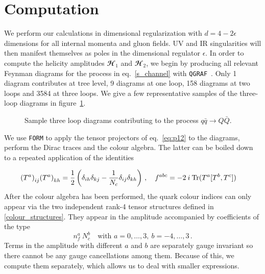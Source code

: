 
\section{Computation}
\label{computation}

We perform our calculations in dimensional regularization with $d = 4 - 2 \epsilon$ dimensions for all internal momenta and gluon fields. UV and IR singularities will then manifest themselves as poles in the dimensional regulator $\epsilon$.
In order to compute the  helicity amplitudes $\mathbfcal{H}_1$ and $\mathbfcal{H}_2$,  we begin by producing all relevant Feynman diagrams for the process in eq.~\eqref{s_channel} with \texttt{QGRAF}~\cite{Nogueira:1991ex}. Only 1 diagram contributes at tree level,  9 diagrams at one loop, 158 diagrams at two loops and 3584 at three loops. We give a few representative samples of the three-loop diagrams in figure~\ref{diagrams}. 
\begingroup
\centering
\begin{figure}[htbp]
\centering
{}\label{fig:1a}
\label{fig:1b}
\label{fig:1c}



\label{fig:1d}
\label{fig:1e}
\label{fig:1f}
\caption{Sample three loop diagrams
contributing to the process $q\bar q \rightarrow Q \bar Q $.} \label{diagrams}
\end{figure}
\endgroup
We use \texttt{FORM} \cite{Vermaseren:2000nd} to apply the tensor projectors of eq.~\eqref{eq:p12} to the diagrams, perform the Dirac traces and the colour algebra.  The latter can be boiled down to a repeated application of the identities

\begin{align}
  {({T^a})}_{ij} {({T^a})}_{kh} &= \frac12
  \left({\delta}_{ih} {\delta}_{kj} - \frac{1}{N_c} {\delta}_{ij} {\delta}_{kh}\right)\,, \quad
f^{abc} = - 2 \: i \: {\rm Tr}(T^a[T^b,T^c])\,
\end{align}
After the colour algebra  has been performed,  the quark colour indices can only appear via the two independent rank-4 tensor structures defined in \eqref{colour_structures}.   They appear in the amplitude accompanied by coefficients of the type 
\begin{equation}
n_f^a \: N_c^b \quad\text{with~}    a=0,\ldots,3,~ b=-4,\ldots,3\,.
\end{equation} 
Terms in the amplitude with different $a$ and $b$ are separately gauge invariant so there cannot be any gauge cancellations among them.
Because of this, we compute them separately, which allows
us to deal with smaller expressions.

